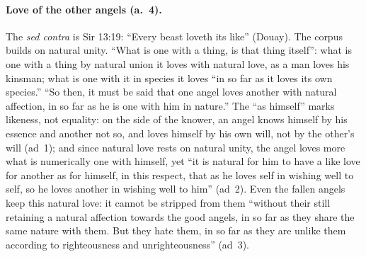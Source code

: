 \paragraph{Love of the other angels (a.~4).} The \emph{sed contra} is
Sir 13:19: ``Every beast loveth its like'' (Douay). The corpus builds on
natural unity. ``What is one with a thing, is that thing itself'': what
is one with a thing by natural union it loves with natural love, as a
man loves his kinsman; what is one with it in species it loves ``in so
far as it loves its own species.'' ``So then, it must be said that one
angel loves another with natural affection, in so far as he is one with
him in nature.'' The ``as himself'' marks likeness, not equality: on the
side of the knower, an angel knows himself by his essence and another
not so, and loves himself by his own will, not by the other's will
(ad~1); and since natural love rests on natural unity, the angel loves
more what is numerically one with himself, yet ``it is natural for him
to have a like love for another as for himself, in this respect, that as
he loves self in wishing well to self, so he loves another in wishing
well to him'' (ad~2). Even the fallen angels keep this natural love: it
cannot be stripped from them ``without their still retaining a natural
affection towards the good angels, in so far as they share the same
nature with them. But they hate them, in so far as they are unlike them
according to righteousness and unrighteousness'' (ad~3).

